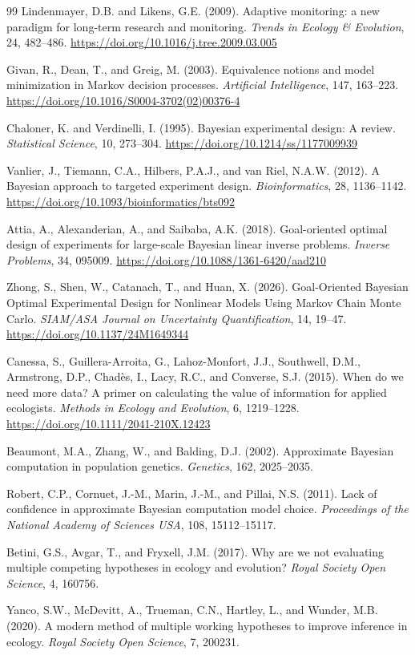 \begin{thebibliography}{99}
Lindenmayer, D.B. and Likens, G.E. (2009).
Adaptive monitoring: a new paradigm for long-term research and monitoring.
\emph{Trends in Ecology \& Evolution}, 24, 482--486.
\url{https://doi.org/10.1016/j.tree.2009.03.005}

Givan, R., Dean, T., and Greig, M. (2003).
Equivalence notions and model minimization in Markov decision processes.
\emph{Artificial Intelligence}, 147, 163--223.
\url{https://doi.org/10.1016/S0004-3702(02)00376-4}

Chaloner, K. and Verdinelli, I. (1995).
Bayesian experimental design: A review.
\emph{Statistical Science}, 10, 273--304.
\url{https://doi.org/10.1214/ss/1177009939}

Vanlier, J., Tiemann, C.A., Hilbers, P.A.J., and van Riel, N.A.W. (2012).
A Bayesian approach to targeted experiment design.
\emph{Bioinformatics}, 28, 1136--1142.
\url{https://doi.org/10.1093/bioinformatics/bts092}

Attia, A., Alexanderian, A., and Saibaba, A.K. (2018).
Goal-oriented optimal design of experiments for large-scale Bayesian linear inverse problems.
\emph{Inverse Problems}, 34, 095009.
\url{https://doi.org/10.1088/1361-6420/aad210}

Zhong, S., Shen, W., Catanach, T., and Huan, X. (2026).
Goal-Oriented Bayesian Optimal Experimental Design for Nonlinear Models Using Markov Chain Monte Carlo.
\emph{SIAM/ASA Journal on Uncertainty Quantification}, 14, 19--47.
\url{https://doi.org/10.1137/24M1649344}

Canessa, S., Guillera-Arroita, G., Lahoz-Monfort, J.J., Southwell, D.M., Armstrong, D.P., Chad\`es, I., Lacy, R.C., and Converse, S.J. (2015).
When do we need more data? A primer on calculating the value of information for applied ecologists.
\emph{Methods in Ecology and Evolution}, 6, 1219--1228.
\url{https://doi.org/10.1111/2041-210X.12423}

Beaumont, M.A., Zhang, W., and Balding, D.J. (2002).
Approximate Bayesian computation in population genetics.
\emph{Genetics}, 162, 2025--2035.

Robert, C.P., Cornuet, J.-M., Marin, J.-M., and Pillai, N.S. (2011).
Lack of confidence in approximate Bayesian computation model choice.
\emph{Proceedings of the National Academy of Sciences USA}, 108, 15112--15117.

Betini, G.S., Avgar, T., and Fryxell, J.M. (2017).
Why are we not evaluating multiple competing hypotheses in ecology and evolution?
\emph{Royal Society Open Science}, 4, 160756.

Yanco, S.W., McDevitt, A., Trueman, C.N., Hartley, L., and Wunder, M.B. (2020).
A modern method of multiple working hypotheses to improve inference in ecology.
\emph{Royal Society Open Science}, 7, 200231.

\end{thebibliography}
